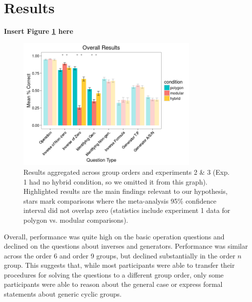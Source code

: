 \documentclass[man,10pt]{apa6}
\begin{document}
\section{Results}
\begin{center} 
{\bf Insert Figure \ref{overall_results} here} 
\end{center}
\begin{figure}
\centering
\includegraphics[width=0.8\textwidth]{figures/overall_results.png}
\caption{Results aggregated across group orders and experiments 2 \& 3 (Exp. 1 had no hybrid condition, so we omitted it from this graph). Highlighted results are the main findings relevant to our hypothesis, stars mark comparisons where the meta-analysis 95\% confidence interval did not overlap zero (statistics include experiment 1 data for polygon vs. modular comparisons).}
\label{overall_results}
\end{figure}
Overall, performance was quite high on the basic operation questions and declined on the questions about inverses and generators. Performance was similar across the order 6 and order 9 groups, but declined substantially in the order $n$ group. This suggests that, while most participants were able to transfer their procedures for solving the questions to a different group order, only some participants were able to reason about the general case or express formal statements about generic cyclic groups.\par
\end{document}
